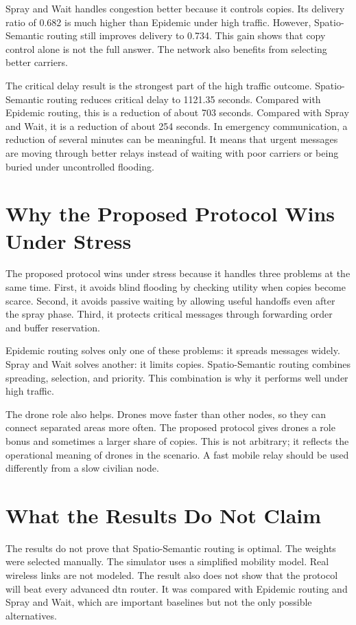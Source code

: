 Spray and Wait handles congestion better because it controls copies. Its delivery ratio of 0.682 is much higher than Epidemic under high traffic. However, Spatio-Semantic routing still improves delivery to 0.734. This gain shows that copy control alone is not the full answer. The network also benefits from selecting better carriers.

The critical delay result is the strongest part of the high traffic outcome. Spatio-Semantic routing reduces critical delay to 1121.35 seconds. Compared with Epidemic routing, this is a reduction of about 703 seconds. Compared with Spray and Wait, it is a reduction of about 254 seconds. In emergency communication, a reduction of several minutes can be meaningful. It means that urgent messages are moving through better relays instead of waiting with poor carriers or being buried under uncontrolled flooding.

\section{Why the Proposed Protocol Wins Under Stress}
The proposed protocol wins under stress because it handles three problems at the same time. First, it avoids blind flooding by checking utility when copies become scarce. Second, it avoids passive waiting by allowing useful handoffs even after the spray phase. Third, it protects critical messages through forwarding order and buffer reservation.

Epidemic routing solves only one of these problems: it spreads messages widely. Spray and Wait solves another: it limits copies. Spatio-Semantic routing combines spreading, selection, and priority. This combination is why it performs well under high traffic.

The drone role also helps. Drones move faster than other nodes, so they can connect separated areas more often. The proposed protocol gives drones a role bonus and sometimes a larger share of copies. This is not arbitrary; it reflects the operational meaning of drones in the scenario. A fast mobile relay should be used differently from a slow civilian node.

\section{What the Results Do Not Claim}
The results do not prove that Spatio-Semantic routing is optimal. The weights were selected manually. The simulator uses a simplified mobility model. Real wireless links are not modeled. The result also does not show that the protocol will beat every advanced \ac{dtn} router. It was compared with Epidemic routing and Spray and Wait, which are important baselines but not the only possible alternatives.


